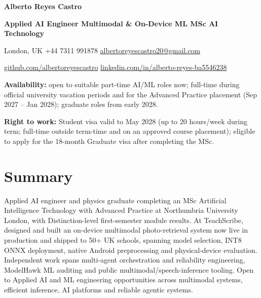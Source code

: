 \documentclass[10pt,a4paper]{article}
\begin{document}
\small

{\LARGE\bfseries Alberto Reyes Castro}\par
{\large\bfseries Applied AI Engineer \textbar{} Multimodal \& On-Device ML \textbar{} MSc AI Technology}\par
\vspace{0.10em}

London, UK \textbar{} +44 7311 991878 \textbar{}
\href{mailto:albertoreyescastro20@gmail.com}{albertoreyescastro20@gmail.com}\par
\href{https://github.com/albertoreyescastro}{github.com/albertoreyescastro}
\textbar{}
\href{https://www.linkedin.com/in/alberto-reyes-ba5546238/}{linkedin.com/in/alberto-reyes-ba5546238}\par

\vspace{0.62em}
\textbf{Availability:} open to suitable part-time AI/ML roles now; full-time during official university vacation periods and for the Advanced Practice placement (Sep 2027 -- Jan 2028); graduate roles from early 2028.\par
\vspace{0.12em}
\textbf{Right to work:} Student visa valid to May 2028 (up to 20 hours/week during term; full-time outside term-time and on an approved course placement); eligible to apply for the 18-month Graduate visa after completing the MSc.\par
\vspace{0.24em}

\section{Summary}

Applied AI engineer and physics graduate completing an MSc Artificial Intelligence Technology with Advanced Practice at Northumbria University London, with Distinction-level first-semester module results. At TeachScribe, designed and built an on-device multimodal photo-retrieval system now live in production and shipped to 50+ UK schools, spanning model selection, INT8 ONNX deployment, native Android preprocessing and physical-device evaluation. Independent work spans multi-agent orchestration and reliability engineering, ModelHawk ML auditing and public multimodal/speech-inference tooling. Open to Applied AI and ML engineering opportunities across multimodal systems, efficient inference, AI platforms and reliable agentic systems.
\end{document}
